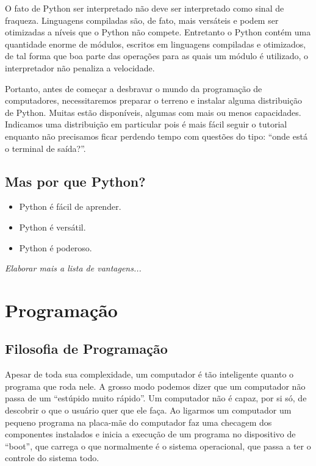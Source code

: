 \documentclass[
	12pt,				%
	openright,			%
	twoside,			%
	a4paper,			%
	english,			%
	french,				%
	brazil,				%
	sumario=tradicional
]{abntex2}
\begin{document}
O fato de Python ser interpretado não deve ser interpretado como sinal de fraqueza. Linguagens compiladas são, de fato, mais versáteis e podem ser otimizadas a níveis que o Python não compete. Entretanto o Python contém uma quantidade enorme de módulos, escritos em linguagens compiladas e otimizados, de tal forma que boa parte das operações para as quais um módulo é utilizado, o interpretador não penaliza a velocidade. 

Portanto, antes de começar a desbravar o mundo da pro\-gra\-ma\-ção de computadores,
necessitaremos preparar o terreno e instalar alguma distribuição de Python. 
Muitas estão disponíveis, algumas com mais ou menos capacidades.
Indicamos uma distribuição em particular pois é mais fácil seguir o tutorial enquanto
não precisamos ficar perdendo tempo com questões do tipo: ``onde está o terminal de saída?''. 


\section[Mas por que Python?] {Mas por que Python?}%
\begin{itemize}
\item Python é fácil de aprender.
\item Python é versátil.
\item Python é poderoso.
\end{itemize}
\emph{Elaborar mais a lista de vantagens...}




\chapter{Programação}

\section{Filosofia de Programação}

Apesar de toda sua complexidade, um computador é tão inteligente quanto o programa que roda nele.
A grosso modo podemos dizer que um computador não passa de um ``estúpido muito rápido''.
Um computador não é capaz, por si só, de descobrir o que o usuário quer que ele faça.
Ao ligarmos um computador um pequeno programa na placa-mãe do computador faz uma checagem dos 
componentes instalados e inicia a execução de um programa no dispositivo de ``boot'', que carrega o que 
normalmente é o sistema operacional, que passa a ter o controle do sistema todo. 
\end{document}
